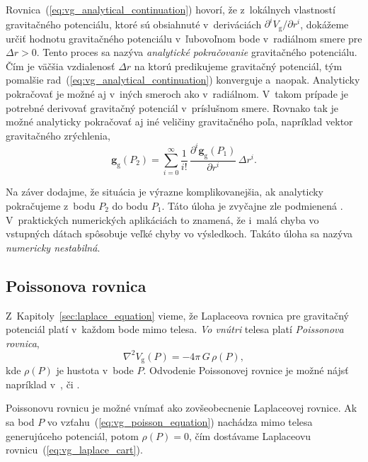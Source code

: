 \documentclass[a4paper, 12pt]{book}
\newcommand{\gidx}{\mathrm g}
\let\vec\mathbf
\begin{document}
Rovnica~(\ref{eq:vg_analytical_continuation}) hovorí, že z~lokálnych vlastností
gravitačného potenciálu, ktoré sú obsiahnuté v~deriváciách $\partial^i V_\gidx
\slash \partial r^i$, dokážeme určiť hodnotu gravitačného potenciálu
v~ľubovoľnom bode v~radiálnom smere pre $\Delta r > 0$.  Tento proces sa nazýva
\emph{analytické pokračovanie} gravitačného potenciálu.  Čím je väčšia
vzdialenosť $\Delta r$ na ktorú predikujeme gravitačný potenciál, tým pomalšie
rad~(\ref{eq:vg_analytical_continuation}) konverguje a~naopak.  Analyticky
pokračovať je možné aj v~iných smeroch ako v~radiálnom.  V~takom prípade je
potrebné derivovať gravitačný potenciál v~príslušnom smere.  Rovnako tak je
možné analyticky pokračovať aj iné veličiny gravitačného poľa, napríklad vektor
gravitačného zrýchlenia,
%
\begin{equation}
\vec g_\gidx(P_2) = \sum_{i = 0}^{\infty} \frac{1}{i!} \, \frac{\partial^i \vec
g_\gidx(P_1)}{\partial r^i} \, \Delta r^i{.}
\end{equation}

Na záver dodajme, že situácia je výrazne komplikovanejšia, ak analyticky
pokračujeme z~bodu $P_2$ do bodu $P_1$.  Táto úloha je zvyčajne zle podmienená
\citep{SansoGeodeticBoundaryValueProblem}.  V~praktických numerických
aplikáciách to znamená, že i~malá chyba vo vstupných dátach spôsobuje veľké
chyby vo výsledkoch.  Takáto úloha sa nazýva \emph{numericky nestabilná}.






\subsection{Poissonova rovnica}
\label{sec:poisson_equation}

Z~Kapitoly~\ref{sec:laplace_equation} vieme, že Laplaceova rovnica pre
gravitačný potenciál platí v~každom bode mimo telesa.  \emph{Vo vnútri} telesa
platí \emph{Poissonova rovnica},
%
\begin{equation}
\label{eq:vg_poisson_equation}
\nabla^2 V_\gidx(P) = -4 \pi \, G \, \rho(P){,}
\end{equation}
%
kde $\rho(P)$ je hustota v~bode $P$.  Odvodenie Poissonovej rovnice je možné
nájsť napríklad v~\cite{MacMillan1930}, \cite{Kellogg1967} či
\cite{SansoGeoidDetermination}.

Poissonovu rovnicu je možné vnímať ako zovšeobecnenie Laplaceovej rovnice.  Ak
sa bod $P$ vo vzťahu~(\ref{eq:vg_poisson_equation}) nachádza mimo telesa
generujúceho potenciál, potom $\rho(P) = 0$, čím dostávame Laplaceovu
rovnicu~(\ref{eq:vg_laplace_cart}).
\end{document}
